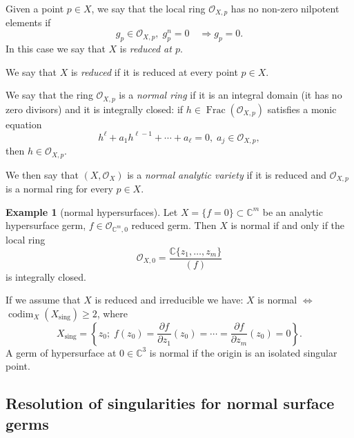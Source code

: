 \documentclass[11pt,twoside]{amsart}
\newcommand{\C}{\mathbb C}
\newcommand{\OO}{\mathcal O}
\DeclareMathOperator{\codim}{codim}
\DeclareMathOperator{\Frac}{Frac}
\DeclareMathOperator{\sing}{sing}
\theoremstyle{definition}
\newtheorem{exe}{Example}
\begin{document}
Given a point $p\in X$, we say that the local ring $\OO_{X,p}$ has no non-zero nilpotent elements if
\[
g_p\in\OO_{X,p},\;g_p^n=0\quad\Rightarrow g_p=0.
\]
In this case we say that $X$ is \textit{reduced at $p$}.

We say that $X$ is \textit{reduced} if it is reduced at every point $p\in X$.

We say that the ring $\OO_{X,p}$ is a \textit{normal ring} if it is an integral domain (it has no zero divisors) and it is integrally closed: if $h\in\Frac(\OO_{X,p})$ satisfies a monic equation
\[
h^\ell+a_1h^{\ell-1}+\cdots+a_\ell=0,\; a_j\in\OO_{X,p},
\]
then $h\in\OO_{X,p}$.


We then say that $(X,\OO_X)$ is a \textit{normal analytic variety} if it is reduced and $\OO_{X,p}$ is a normal ring for every $p\in X$.

\begin{exe}[normal hypersurfaces]
Let $X=\{f=0\}\subset \C^m$ be an analytic hypersurface germ, $f\in\OO_{\C^m,0}$ reduced germ. Then $X$ is normal if and only if the local ring
\[
\OO_{X,0}=\frac{\C\{z_1,\ldots,z_m\}}{(f)}
\]
is integrally closed.

If we assume that $X$ is reduced and irreducible we have:
$X $  is normal $\Longleftrightarrow$ $\codim_X(X_{\sing})\geq 2$, where
\[
X_{\sing}=\left\{z_0;\;
 f(z_0)=\frac{\partial f}{\partial z_1}(z_0)=\cdots=
 \frac{\partial f}{\partial z_m}(z_0)=0\right\}.
\]
A germ of hypersurface at $0\in\C^3$ is normal if the origin is an isolated singular point.
\end{exe}

\subsection{Resolution of singularities for normal surface germs}
\end{document}
